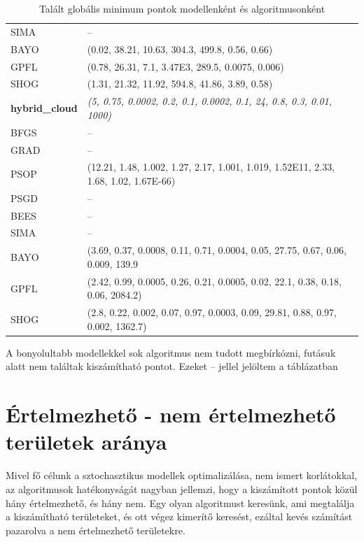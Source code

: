 \begin{table}
\begin{tabular}{ll}
		SIMA & --\\
		BAYO & (0.02, 38.21, 10.63, 304.3, 499.8, 0.56, 0.66)\\
		GPFL & (0.78, 26.31, 7.1, 3.47E3, 289.5, 0.0075, 0.006)\\
		SHOG & (1.31, 21.32, 11.92, 594.8, 41.86, 3.89, 0.58)\\
		\hline
		\textbf{hybrid\_cloud} & \textit{(5, 0.75, 0.0002, 0.2, 0.1, 0.0002, 0.1, 24, 0.8, 0.3, 0.01, 1000)}\\
		\hline
		BFGS & --\\
		GRAD & --\\
		PSOP & (12.21, 1.48, 1.002, 1.27, 2.17, 1.001, 1.019, 1.52E11, 2.33, 1.68, 1.02, 1.67E-66)\\
		PSGD & --\\
		BEES & --\\
		SIMA & --\\
		BAYO & (3.69, 0.37, 0.0008, 0.11, 0.71, 0.0004, 0.05, 27.75, 0.67, 0.06, 0.009, 139.9\\
		GPFL & (2.42, 0.99, 0.0005, 0.26, 0.21, 0.0005, 0.02, 22.1, 0.38, 0.18, 0.06, 2084.2)\\
		SHOG & (2.8, 0.22, 0.002, 0.07, 0.97, 0.0003, 0.09, 29.81, 0.88, 0.97, 0.002, 1362.7)\\	
	\end{tabular}
	\caption{Talált globális minimum pontok modellenként és algoritmusonként}
	\label{table:globalminimumpoints}
	\begin{tablenotes}
		A bonyolultabb modellekkel sok algoritmus nem tudott megbírkózni, futásuk alatt nem találtak kiszámítható pontot. Ezeket -- jellel jelöltem a táblázatban
	\end{tablenotes}
\end{table}
\section{Értelmezhető - nem értelmezhető területek aránya}
\label{sec:teruletek}
Mivel fő célunk a sztochasztikus modellek optimalizálása, nem ismert korlátokkal, az algoritmusok hatékonyságát nagyban jellemzi, hogy a kiszámított pontok közül hány értelmezhető, és hány nem. Egy olyan algoritmust keresünk, ami megtalálja a kiszámítható területeket, és ott végez kimerítő keresést, ezáltal kevés számítást pazarolva a nem értelmezhető területekre.

